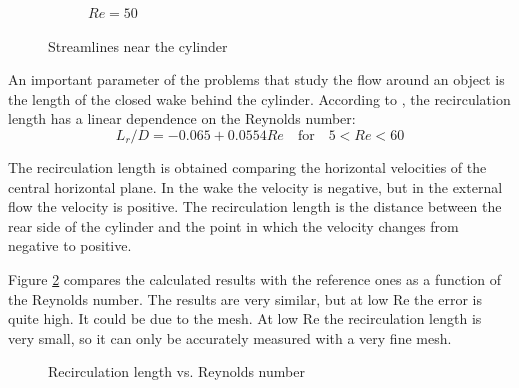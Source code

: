 \begin{figure}[H]
\begin{subfigure}{0.5\textwidth}
		\caption{$Re=50$}
	\end{subfigure}
	\caption{Streamlines near the cylinder}
	\label{StreamlinesCylinder}
\end{figure}

\pagebreak
An important parameter of the problems that study the flow around an object is the length of the closed wake behind the cylinder. According to \cite{Breuer2000}, the recirculation length has a linear dependence on the Reynolds number:
\begin{equation}
L_{r}/D=-0.065+0.0554Re \quad \textrm{for} \quad 5<Re<60
\end{equation}

The recirculation length is obtained comparing the horizontal velocities of the central horizontal plane. In the wake the velocity is negative, but in the external flow the velocity is positive. The recirculation length is the distance between the rear side of the cylinder and the point in which the velocity changes from negative to positive.

Figure \ref{RecirculationReynolds} compares the calculated results with the reference ones as a function of the Reynolds number. The results are very similar, but at low Re the error is quite high. It could be due to the mesh. At low Re the recirculation length is very small, so it can only be accurately measured with a very fine mesh.
\begin{figure}[H]
	\centering
	
	\caption{Recirculation length vs. Reynolds number}
	\label{RecirculationReynolds}
\end{figure}